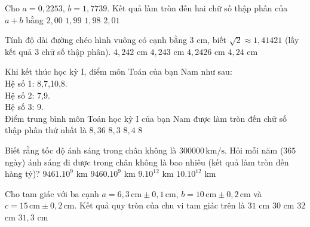 \begin{ex}%
	Cho $ a=0,2253$, $b=1,7739 $. Kết quả làm tròn đến hai chữ số thập phân của $a+b$ bằng
	\choice
	{\True $ 2,00 $}
	{ $ 1,99 $}
	{ $ 1,98 $}
	{ $ 2,01 $}
\end{ex}

\begin{ex}%
	Tính độ dài đường chéo hình vuông có cạnh bằng $ 3 $ cm, biết $ \sqrt{2} \approx 1,41421 $ (lấy kết quả 3 chữ số thập phân).
	\choice
	{$4,242 $ cm}
	{\True  $ 4,243 $ cm}
	{ $ 4,2426 $ cm}
	{ $ 4,24 $ cm}
\end{ex}

\begin{ex}%
	Khi kết thúc học kỳ I, điểm môn Toán của bạn Nam như sau:\\
	Hệ số 1: 8,7,10,8.\\
	Hệ số 2: 7,9.\\
	Hệ số 3: 9.\\
	Điểm trung bình môn Toán học kỳ I của bạn Nam được làm tròn đến chữ số thập phân thứ nhất là
	\choice
	{ $ 8,36 $}
	{ $ 8,3 $}
	{\True $ 8,4 $}
	{ $ 8 $}
\end{ex}

\begin{ex}%
	Biết rằng tốc độ ánh sáng trong chân không là $300000 \mathrm{\,km/s} $. Hỏi mỗi năm ($ 365 $ ngày) ánh sáng đi được trong chân không là bao nhiêu (kết quả làm tròn đến hàng tỷ)?
	\choice
	{\True $9461.10^{9} $ km}
	{ $9460.10^{9} $ km}
	{ $9.10^{12} $ km}
	{$10.10^{12} $ km}
\end{ex}

\begin{ex}%
	Cho tam giác với ba cạnh $ a=6,3 \mathrm{\,cm} \pm 0,1 \mathrm{\,cm}$, $ b=10 \mathrm{\,cm} \pm 0,2 \mathrm{\,cm}$ và $ c=15 \mathrm{\,cm} \pm 0,2 \mathrm{\,cm}$. Kết quả quy tròn của chu vi tam giác trên là
	\choice
	{\True  $ 31$ cm}
	{ $ 30 $ cm}
	{ $ 32 $ cm}
	{ $ 31,3 $ cm}
\end{ex}


